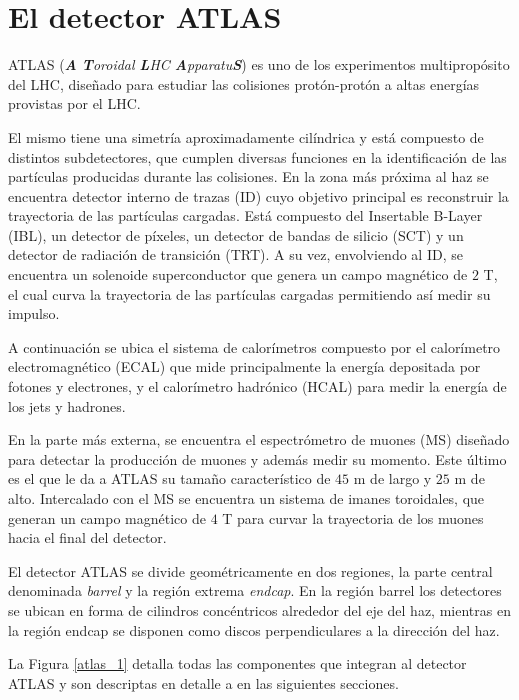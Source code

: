 \section{El detector ATLAS}


ATLAS (\textit{\textbf{A} \textbf{T}oroidal \textbf{L}HC \textbf{A}pparatu\textbf{S}})  \cite{PERF-2007-01} es uno de los experimentos multipropósito del LHC, diseñado para estudiar las colisiones protón-protón a altas energías provistas por el LHC.

El mismo tiene una simetría aproximadamente cilíndrica y está compuesto de distintos subdetectores, que cumplen diversas funciones en la identificación de las partículas producidas durante las colisiones. En la zona más próxima al haz se encuentra detector interno de trazas (ID) cuyo objetivo principal es reconstruir la trayectoria de las partículas cargadas. Está compuesto del Insertable B-Layer (IBL), un detector de píxeles, un detector de bandas de silicio (SCT) y un detector de radiación de transición (TRT). A su vez, envolviendo al ID, se encuentra un solenoide superconductor que genera un campo magnético de $2$ T, el cual curva la trayectoria de las partículas cargadas permitiendo así medir su impulso.

A continuación se ubica el sistema de calorímetros compuesto por el calorímetro electromagnético (ECAL) que mide principalmente la energía depositada por fotones y electrones, y el calorímetro hadrónico (HCAL) para medir la energía de los jets y hadrones.

En la parte más externa, se encuentra el espectrómetro de muones (MS) diseñado para detectar la producción de muones y además medir su momento. Este último es el que le da a ATLAS su tamaño característico de $45$ m de largo y $25$ m de alto. Intercalado con el MS se encuentra un sistema de imanes toroidales, que generan un campo magnético de $4$ T para curvar la trayectoria de los muones hacia el final del detector.

El detector ATLAS se divide geométricamente en dos regiones, la parte central denominada \textit{barrel} y la región extrema \textit{endcap}. En la región barrel los detectores se ubican en forma de cilindros concéntricos alrededor del eje del haz, mientras en la región endcap se disponen como discos perpendiculares a la dirección del haz. 

La Figura \ref{atlas_1} detalla todas las componentes que integran al detector ATLAS y son descriptas en detalle a en las siguientes secciones.

